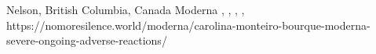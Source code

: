           {Nelson, British Columbia, Canada}
          {}
          {Moderna}          
          {, }
          {
            ,
            ,
            ,
          }
          {https://nomoresilence.world/moderna/carolina-monteiro-bourque-moderna-severe-ongoing-adverse-reactions/}

